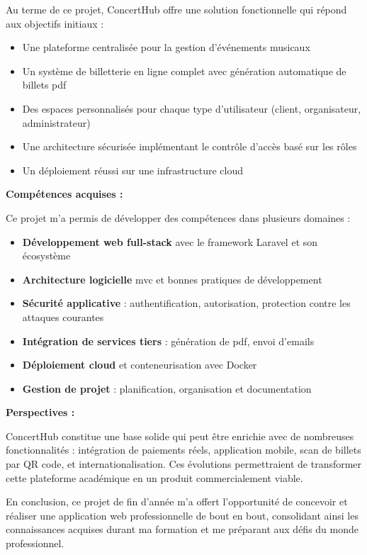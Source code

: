 \documentclass[a4paper,12pt,twoside]{report}
\begin{document}
Au terme de ce projet, ConcertHub offre une solution fonctionnelle qui répond aux objectifs initiaux :
\begin{itemize}
    \item Une plateforme centralisée pour la gestion d'événements musicaux
    \item Un système de billetterie en ligne complet avec génération automatique de billets \gls{pdf}
    \item Des espaces personnalisés pour chaque type d'utilisateur (client, organisateur, administrateur)
    \item Une architecture sécurisée implémentant le contrôle d'accès basé sur les rôles
    \item Un déploiement réussi sur une infrastructure cloud
\end{itemize}

\textbf{Compétences acquises :}

Ce projet m'a permis de développer des compétences dans plusieurs domaines :
\begin{itemize}
    \item \textbf{Développement web full-stack} avec le framework Laravel et son écosystème
    \item \textbf{Architecture logicielle} \gls{mvc} et bonnes pratiques de développement
    \item \textbf{Sécurité applicative} : authentification, autorisation, protection contre les attaques courantes
    \item \textbf{Intégration de services tiers} : génération de \gls{pdf}, envoi d'emails
    \item \textbf{Déploiement cloud} et conteneurisation avec Docker
    \item \textbf{Gestion de projet} : planification, organisation et documentation
\end{itemize}

\textbf{Perspectives :}

ConcertHub constitue une base solide qui peut être enrichie avec de nombreuses fonctionnalités : intégration de paiements réels, application mobile, scan de billets par QR code, et internationalisation. Ces évolutions permettraient de transformer cette plateforme académique en un produit commercialement viable.

En conclusion, ce projet de fin d'année m'a offert l'opportunité de concevoir et réaliser une application web professionnelle de bout en bout, consolidant ainsi les connaissances acquises durant ma formation et me préparant aux défis du monde professionnel.
\end{document}
